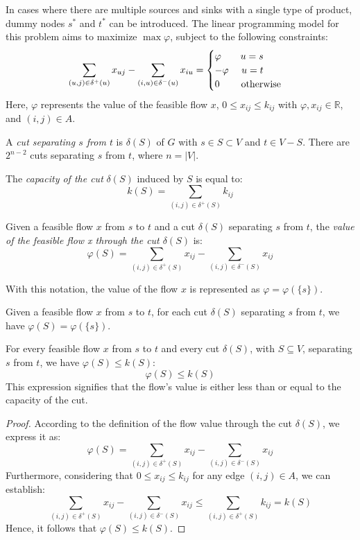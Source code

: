 \documentclass[12pt, a4paper]{report}
\begin{document}
    In cases where there are multiple sources and sinks with a single type of product, dummy nodes $s^{*}$ and $t^{*}$ can be introduced. 
    The linear programming model for this problem aims to maximize $\max \varphi$, subject to the following constraints:
    \[\sum_{(u,j)\in \delta^{+}(u)}x_{uj}-\sum_{(i,u)\in \delta^{-}(u)}x_{iu}=
    \begin{cases}
        \varphi \:\:\:\:\:\:\:\:\: u=s    \\
        -\varphi \:\:\:\:\:\: u=t   \\
        0 \:\:\:\:\:\:\:\:\:\: \textnormal{otherwise}
    \end{cases}\]
    Here, $\varphi$ represents the value of the feasible flow $x$, $0 \leq x_{ij} \leq k_{ij}$ with $\varphi,x_{ij} \in \mathbb{R}$, and $(i,j) \in A$.
    \begin{definition}
        A \emph{cut separating $s$ from $t$} is $\delta(S)$ of $G$ with $s \in S \subset V$ and $t \in V-S$. There are $2^{n-2}$ cuts separating $s$ from $t$, where 
        $n=\left\lvert V \right\rvert $.

        The \emph{capacity of the cut} $\delta(S)$ induced by $S$ is equal to: 
        \[k(S)=\sum_{(i,j)\in \delta^{+}(S)}k_{ij}\]

        Given a feasible flow $x$ from $s$ to $t$ and a cut $\delta(S)$ separating $s$ from $t$, the \emph{value of the feasible flow x through the cut $\delta(S)$} is: 
        \[\varphi(S)=\sum_{(i,j)\in \delta^{+}(S)}x_{ij} - \sum_{(i,j)\in \delta^{-}(S)}x_{ij}\]
    \end{definition}
    With this notation, the value of the flow $x$ is represented as $\varphi = \varphi(\{s\})$. 
    \begin{property}
        Given a feasible flow $x$ from $s$ to $t$, for each cut $\delta(S)$ separating $s$ from $t$, we have $\varphi(S)=\varphi(\{s\})$.
    \end{property}
    \begin{property}
        For every feasible flow $x$ from $s$ to $t$ and every cut $\delta(S)$, with $S \subseteq V$, separating $s$ from $t$, we have $\varphi(S) \leq k(S)$:
        \[\varphi(S) \leq k(S)\]
        This expression signifies that the flow's value is either less than or equal to the capacity of the cut.
    \end{property}
    \begin{proof}
        According to the definition of the flow value through the cut $\delta(S)$, we express it as:
        \[\varphi(S)=\sum_{(i,j) \in \delta^{+}(S)}x_{ij}-\sum_{(i,j) \in \delta^{-}(S)}x_{ij}\]
        Furthermore, considering that $0 \leq x_{ij } \leq k_{ij}$ for any edge $(i, j) \in A$, we can establish:
        \[\sum_{(i,j) \in \delta^{+}(S)}x_{ij}-\sum_{(i,j) \in \delta^{-}(S)}x_{ij} \leq \sum_{(i,j) \in \delta^{+}(S)}k_{ij}=k(S)\]
        Hence, it follows that $\varphi(S) \leq k(S)$.
    \end{proof}
\end{document}
